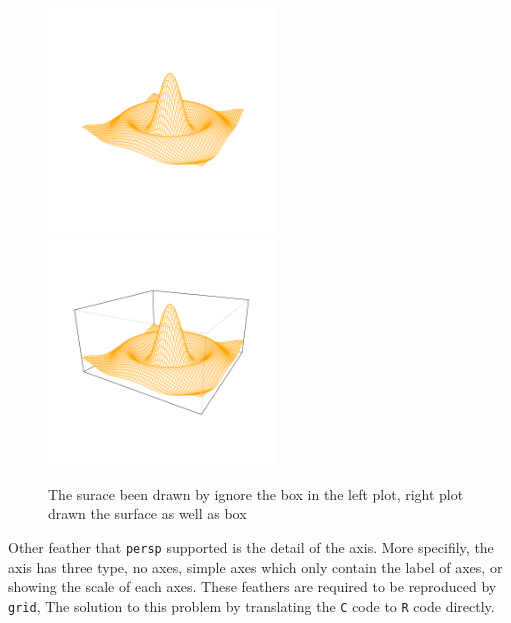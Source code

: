 \documentclass[paper=a4, fontsize=11pt]{report}
\begin{document}
\newpage
\begin{figure}[h]
\begin{center}
  \includegraphics[height = 6cm, width = 6cm]{figure/box_example_1.pdf}
  \includegraphics[height = 6cm, width = 6cm]{figure/box_example_2.pdf}
  \caption{The surace been drawn by ignore the box in the left plot, right plot drawn the surface as well as box}
  	\label{figure8}
\end{center}
\end{figure}

Other feather that \texttt{persp} supported is the detail of the axis. More specifily, the axis has three type, no axes, simple axes which only contain the label of axes, or showing the scale of each axes. These feathers are required to be reproduced by \texttt{grid}, The solution to this problem by translating the \texttt{C} code to \texttt{R} code directly.
\end{document}
